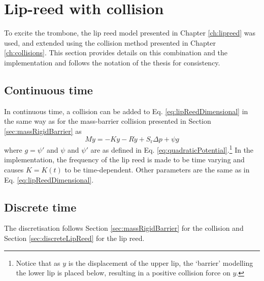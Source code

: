 
\section{Lip-reed with collision}\label{sec:lipReedWithCollision}
\def\nph{}
\def\nphSys{n+1/2}
To excite the trombone, the lip reed model presented in Chapter \ref{ch:lipreed} was used, and extended using the collision method presented in Chapter \ref{ch:collisions}. This section provides details on this combination and the implementation and follows the notation of the thesis for consistency.

\subsection{Continuous time}
In continuous time, a collision can be added to Eq. \eqref{eq:lipReedDimensional} in the same way as for the mass-barrier collision presented in Section \ref{sec:massRigidBarrier} as
\begin{equation}\label{eq:lipWithCollisionCont}
    M\ddot y = -K y - R \dot y + S_\text{r}\Delta p + \psi g
\end{equation}
where $g = \psi'$ and $\psi$ and $\psi'$ are as defined in Eq. \eqref{eq:quadraticPotential}.\footnote{Notice that as $y$ is the displacement of the upper lip, the `barrier' modelling the lower lip is placed below, resulting in a positive collision force on $y$.} In the implementation, the frequency of the lip reed is made to be time varying and causes $K = K(t)$ to be time-dependent. Other parameters are the same as in Eq. \eqref{eq:lipReedDimensional}.

\subsection{Discrete time}
The discretisation follows Section \ref{sec:massRigidBarrier} for the collision and Section \ref{sec:discreteLipReed} for the lip reed.

